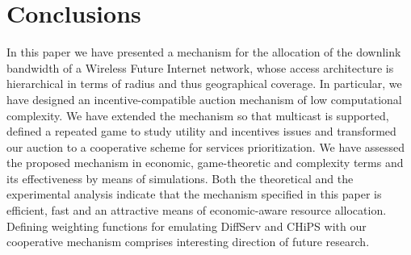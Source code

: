 \documentclass[a4paper]{article}
\begin{document}
\section{Conclusions}\label{sec:concl}

In this paper we have presented a mechanism for the allocation of the downlink 
bandwidth of a Wireless Future Internet network, whose access architecture is 
hierarchical in terms of radius and thus geographical coverage.  
In particular, we have designed an incentive-compatible auction mechanism 
of low computational complexity. We have extended the mechanism so that 
multicast is supported, defined a repeated game to study utility and incentives
issues and transformed our auction to a cooperative 
scheme for services prioritization. We have assessed the proposed mechanism
in economic, game-theoretic and complexity terms and its effectiveness by 
means of simulations.
Both the theoretical and the experimental analysis indicate that the mechanism 
specified in this paper is  efficient, fast and an attractive means of 
economic-aware resource allocation. 
Defining weighting functions for 
emulating DiffServ and CHiPS with
our cooperative mechanism comprises interesting direction of future research.
\end{document}

